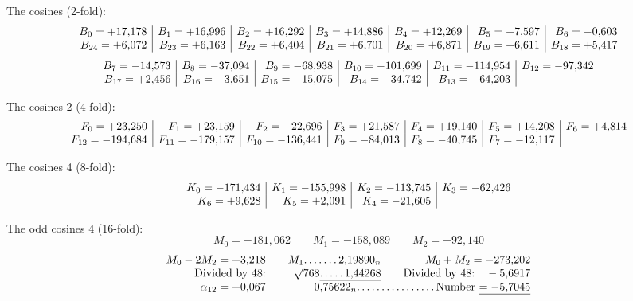 \begin{landscape}
\[\]
\par\noindent\hspace*{\parindent}The cosines (2-fold):
\[
\begin{array}{@{}r|r|r|r|r|r|r@{}}
B_0=+17{,}178&B_1=+16{,}996&B_2=+16{,}292&B_3=+14{,}886&B_4=+12{,}269&B_5=+7{,}597&B_6=-0{,}603\\
B_{24}=+6{,}072&B_{23}=+6{,}163&B_{22}=+6{,}404&B_{21}=+6{,}701&B_{20}=+6{,}871&B_{19}=+6{,}611&B_{18}=+5{,}417
\end{array}
\]
\[
\begin{array}{@{}r|r|r|r|r|r@{}}
B_7=-14{,}573&B_8=-37{,}094&B_9=-68{,}938&B_{10}=-101{,}699&B_{11}=-114{,}954&B_{12}=-97{,}342\\
B_{17}=+2{,}456&B_{16}=-3{,}651&B_{15}=-15{,}075&B_{14}=-34{,}742&B_{13}=-64{,}203&
\end{array}
\]
\par\noindent\hspace*{\parindent}The cosines 2 (4-fold):
\[
\begin{array}{@{}r|r|r|r|r|r|r@{}}
F_0=+23{,}250&F_1=+23{,}159&F_2=+22{,}696&F_3=+21{,}587&F_4=+19{,}140&F_5=+14{,}208&F_6=+4{,}814\\
F_{12}=-194{,}684&F_{11}=-179{,}157&F_{10}=-136{,}441&F_9=-84{,}013&F_8=-40{,}745&F_7=-12{,}117&
\end{array}
\]
\newcommand{\VfourDots}[1]{\begingroup\count255=#1\relax\loop\mathord{.}\,\advance\count255 by -1\ifnum\count255>0\repeat\endgroup}
\clearpage{}
\par\noindent\hspace*{\parindent}The cosines 4 (8-fold):
\[
\begin{array}{@{}r|r|r|r@{}}
K_0=-171{,}434&K_1=-155{,}998&K_2=-113{,}745&K_3=-62{,}426\\
K_6=+9{,}628&K_5=+2{,}091&K_4=-21{,}605&
\end{array}
\]
\par\noindent\hspace*{\parindent}The odd cosines 4 (16-fold):
\[M_0=-181{,}062\qquad M_1=-158{,}089\qquad M_2=-92{,}140\]
\[
\begin{array}{@{}r@{\qquad}r@{\qquad}r@{}}
M_0-2M_2=+3{,}218&M_1\VfourDots{6}2{,}19890_n&M_0+M_2=-273{,}202\\
\text{Divided by 48:}&\BareRoot{768}\underline{\VfourDots{4}1{,}44268}&\text{Divided by 48:}\quad-5{,}6917\\
\alpha_{12}=+0{,}067&\multicolumn{2}{r@{}}{0{,}75622_n\VfourDots{15}\text{Number}\ \underline{= -5{,}7045}}\\

\end{array}\]
\end{landscape}
